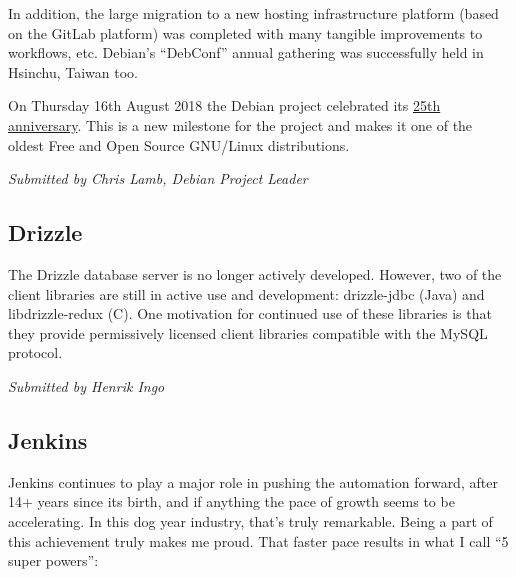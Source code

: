 \documentclass[a4paper]{report}
\begin{document}
In addition, the large migration to a new hosting infrastructure
platform (based on the GitLab platform) was completed with many tangible
improvements to workflows, etc.  Debian's ``DebConf'' annual gathering
was successfully held in Hsinchu, Taiwan too.

On Thursday 16th August 2018 the Debian project celebrated its
\href{https://bits.debian.org/2018/08/debian-is-25.html}{25th
anniversary}.  This is a new milestone for the project and makes it one
of the oldest Free and Open Source GNU/Linux distributions.

{\em Submitted by Chris Lamb, Debian Project Leader}

\subsection{Drizzle}

The Drizzle database server is no longer actively developed.  However,
two of the client libraries are still in active use and development:
drizzle-jdbc (Java) and libdrizzle-redux (C).  One motivation for
continued use of these libraries is that they provide permissively
licensed client libraries compatible with the MySQL protocol.

{\em Submitted by Henrik Ingo}

\subsection{Jenkins}

Jenkins continues to play a major role in pushing the automation
forward, after 14+ years since its birth, and if anything the pace of
growth seems to be accelerating. In this dog year industry, that's truly
remarkable. Being a part of this achievement truly makes me proud. That
faster pace results in what I call ``5 super powers'':
\end{document}
